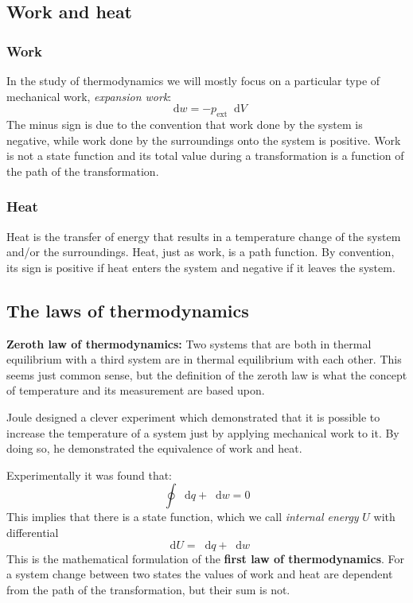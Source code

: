 \documentclass[12pt,a4paper]{report}
\newcommand*\diff{\mathop{}\!\mathrm{d}}
\begin{document}
   \subsection*{Work and heat}
   \subsubsection*{Work}
   In the study of thermodynamics we will mostly focus on a particular type of mechanical work, \textit{expansion work}:
   \begin{equation*}
   \diff w=-p_{\mathrm{ext}}\diff V
   \end{equation*}
   The minus sign is due to the convention that work done by the system is negative, while work done by the surroundings onto the system is positive. Work is not a state function and its total value during a transformation is a function of the path of the transformation.
   \subsubsection*{Heat}
   Heat is the transfer of energy that results in a temperature change of the system and/or the surroundings. 
   Heat, just as work, is a path function. By convention, its sign is positive if heat enters the system and negative if it leaves the system.
   \subsection*{The laws of thermodynamics}
   \textbf{Zeroth law of thermodynamics:} Two systems that are both in thermal equilibrium with a third system are in thermal equilibrium with each other. This seems just common sense, but the definition of the zeroth law is what the concept of temperature and its measurement are based upon.
   
   Joule designed a clever experiment which demonstrated that it is possible to increase the temperature of a system just by applying mechanical work to it. By doing so, he demonstrated the equivalence of work and heat.
   
   Experimentally it was found that:
   \begin{equation*}
   \oint\diff q+\diff w=0
   \end{equation*}
   This implies that there is a state function, which we call \textit{internal energy} $U$ with differential 
   \begin{equation*}
   \diff U=\diff q+\diff w
   \end{equation*}
   This is the mathematical formulation of the \textbf{first law of thermodynamics}.
   For a system change between two states the values of work and heat are dependent from the path of the transformation, but their sum is not. 
    
\end{document}
